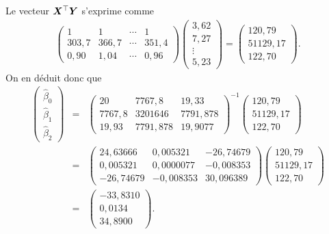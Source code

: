 Le vecteur $\bm{X}^\top\bm{Y}$ s'exprime comme
\begin{eqnarray*}
\left(
\begin{array}{cccc}
1 & 1 & \cdots & 1 \\
303,7 & 366,7 & \cdots & 351,4 \\
0,90 & 1,04 & \cdots & 0,96
\end{array}
\right)
\left(
\begin{array}{c}
3,62 \\
7,27 \\
\vdots \\
5,23
\end{array}
\right)
=
\left(
\begin{array}{r}
120,79 \\
51129,17 \\
122,70
\end{array}
\right).
\end{eqnarray*}
On en déduit donc que
\begin{eqnarray*}
\left(
\begin{array}{c}
\hat\beta_0 \\
\hat\beta_1 \\
\hat\beta_2
\end{array}
\right)
& = &
\left(
\begin{array}{ccc}
20 & 7767,8 & 19,33 \\
7767,8 & 3201646 & 7791,878 \\
19,93 & 7791,878 & 19,9077
\end{array}
\right)^{-1}
\left(
\begin{array}{r}
120,79 \\
51129,17 \\
122,70
\end{array}
\right) \\
& = &
\left(
\begin{array}{rrr}
24,63666 & 0,005321 & -26,74679 \\
0,005321 & 0,0000077 & -0,008353 \\
-26,74679 & -0,008353 & 30,096389
\end{array}
\right)
\left(
\begin{array}{r}
120,79 \\
51129,17 \\
122,70
\end{array}
\right) \\
& = &
\left(
\begin{array}{r}
-33,8310 \\
0,0134 \\
34,8900
\end{array}
\right).
\end{eqnarray*}
